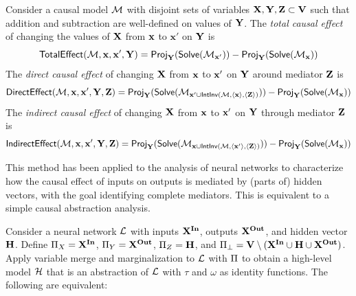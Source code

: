 \documentclass[twoside,11pt]{article}
\begin{document}
\begin{definition}

Consider a causal model $\mathcal{M}$ with disjoint sets of variables $\mathbf{X}, \mathbf{Y}, \mathbf{Z} \subset \mathbf{V}$ such that addition and subtraction are well-defined on values of $\mathbf{Y}$. The \textit{total causal effect} of changing the values of $\mathbf{X}$ from $\mathbf{x}$ to $\mathbf{x'}$ on $\mathbf{Y}$ is 
\[\mathsf{TotalEffect}(\mathcal{M},\mathbf{x}, \mathbf{x}', \mathbf{Y}) = \mathsf{Proj}_{ \mathbf{Y}}(\mathsf{Solve}(\mathcal{M}_{\mathbf{x}'})) - \mathsf{Proj}_{ \mathbf{Y}}(\mathsf{Solve}(\mathcal{M}_{\mathbf{x}}))\]
The \textit{direct causal effect} of changing $\mathbf{X}$ from $\mathbf{x}$ to $\mathbf{x}'$ on $\mathbf{Y}$ around mediator $\mathbf{Z}$ is 
\[\mathsf{DirectEffect}(\mathcal{M},\mathbf{x}, \mathbf{x}', \mathbf{Y}, \mathbf{Z}) = \mathsf{Proj}_{ \mathbf{Y}}(\mathsf{Solve}(\mathcal{M}_{\mathbf{x}' \cup \mathsf{IntInv}(\mathcal{M}, \langle \mathbf{x} \rangle, \langle \mathbf{Z} \rangle)})) - \mathsf{Proj}_{ \mathbf{Y}}(\mathsf{Solve}(\mathcal{M}_{\mathbf{x}}))\]
The \textit{indirect causal effect} of changing $\mathbf{X}$ from $\mathbf{x}$ to $\mathbf{x}'$ on $\mathbf{Y}$ through mediator $\mathbf{Z}$ is 
\[\mathsf{IndirectEffect}(\mathcal{M},\mathbf{x}, \mathbf{x}', \mathbf{Y}, \mathbf{Z}) = \mathsf{Proj}_{\mathbf{Y}}(\mathsf{Solve}(\mathcal{M}_{\mathbf{x} \cup \mathsf{IntInv}(\mathcal{M}, \langle \mathbf{x}' \rangle, \langle \mathbf{Z} \rangle)})) - \mathsf{Proj}_{ \mathbf{Y}}(\mathsf{Solve}(\mathcal{M}_{\mathbf{x}}))\]
\end{definition}

This method has been applied to the analysis of neural networks to characterize how the causal effect of inputs on outputs is mediated by (parts of) hidden vectors, with the goal identifying complete mediators. This is equivalent to a simple causal abstraction analysis.


\begin{remark}
Consider a neural network $\mathcal{L}$ with inputs $\mathbf{X}^{\mathbf{In}}$, outputs $\mathbf{X}^{\mathbf{Out}}$, and hidden vector $\mathbf{H}$. 
Define $\Pi_X = \mathbf{X}^{\mathbf{In}}$, $\Pi_Y = \mathbf{X}^{\mathbf{Out}}$, $\Pi_{Z} = \mathbf{H}$, and $\Pi_{\bot} = \mathbf{V} \setminus (\mathbf{X}^{\mathbf{In}} \cup \mathbf{H} \cup \mathbf{X}^{\mathbf{Out}})$. Apply variable merge and marginalization to $\mathcal{L}$ with $\Pi$ to obtain a high-level model $\mathcal{H}$ that is an abstraction of $\mathcal{L}$ with $\tau$ and $\omega$ as identity functions. The following are equivalent:
\end{remark}
\end{document}

